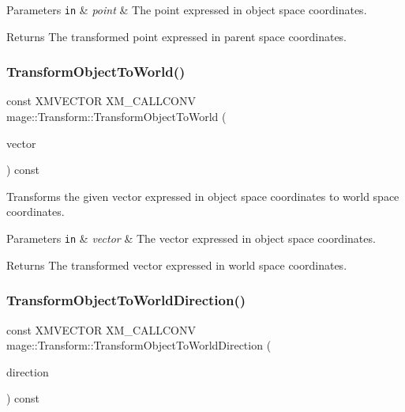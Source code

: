 \begin{DoxyParams}[1]{Parameters}
\mbox{\tt in}  & {\em point} & The point expressed in object space coordinates. \\
\hline
\end{DoxyParams}
\begin{DoxyReturn}{Returns}
The transformed point expressed in parent space coordinates. 
\end{DoxyReturn}
\hypertarget{classmage_1_1_transform_a9d560741131cf68503e725346d681991}{}\label{classmage_1_1_transform_a9d560741131cf68503e725346d681991} 
\subsubsection{\texorpdfstring{Transform\+Object\+To\+World()}{TransformObjectToWorld()}}
{\footnotesize\ttfamily const X\+M\+V\+E\+C\+T\+OR X\+M\+\_\+\+C\+A\+L\+L\+C\+O\+NV mage\+::\+Transform\+::\+Transform\+Object\+To\+World (\begin{DoxyParamCaption}\item[{F\+X\+M\+V\+E\+C\+T\+OR}]{vector }\end{DoxyParamCaption}) const\hspace{0.3cm}{\ttfamily [noexcept]}}

Transforms the given vector expressed in object space coordinates to world space coordinates.


\begin{DoxyParams}[1]{Parameters}
\mbox{\tt in}  & {\em vector} & The vector expressed in object space coordinates. \\
\hline
\end{DoxyParams}
\begin{DoxyReturn}{Returns}
The transformed vector expressed in world space coordinates. 
\end{DoxyReturn}
\hypertarget{classmage_1_1_transform_ae2bd913d2092e4f41cf65072b49df4d7}{}\label{classmage_1_1_transform_ae2bd913d2092e4f41cf65072b49df4d7} 
\subsubsection{\texorpdfstring{Transform\+Object\+To\+World\+Direction()}{TransformObjectToWorldDirection()}}
{\footnotesize\ttfamily const X\+M\+V\+E\+C\+T\+OR X\+M\+\_\+\+C\+A\+L\+L\+C\+O\+NV mage\+::\+Transform\+::\+Transform\+Object\+To\+World\+Direction (\begin{DoxyParamCaption}\item[{F\+X\+M\+V\+E\+C\+T\+OR}]{direction }\end{DoxyParamCaption}) const\hspace{0.3cm}{\ttfamily [noexcept]}}

